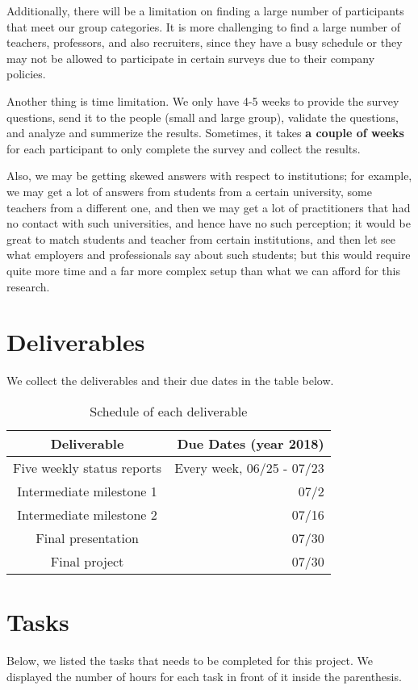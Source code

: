 \documentclass{sigchi}
\begin{document}
Additionally, there will be a limitation on finding a large number of participants that meet our group categories. It is more challenging to find a large number of teachers, professors, and also recruiters, since they have a busy schedule or they may not be allowed to participate in certain surveys due to their company policies. 
  
 Another thing is time limitation. We only have 4-5 weeks to provide the survey questions, send it to the people (small and large group), validate the questions, and analyze and summerize the results. Sometimes, it takes \textbf{a couple of weeks} for each participant to only complete the survey and collect the results.
 
 Also, we may be getting skewed answers with respect to institutions; for example, we may get a lot of answers from students from a certain university, some teachers from a different one, and then we may get a lot of practitioners that had no contact with such universities, and hence have no such perception; it would be great to match students and teacher from certain institutions, and then let see what employers and professionals say about such students; but this would require quite more time and a far more complex setup than what we can afford for this research.
 
  
 \section{Deliverables}
 We collect the deliverables and their due dates in the table below.
 
 \begin{table}[H]
 \centering
 \begin{tabular}{c r} 					%
 \hline\hline						%
 Deliverable & Due Dates (year 2018)\\
 \hline
 Five weekly status reports & Every week, 06/25 - 07/23\\
 Intermediate milestone 1 & 07/2\\
 Intermediate milestone 2 & 07/16\\
 Final presentation & 07/30\\
 Final project & 07/30\\
 \hline
 \end{tabular}
 \caption{Schedule of each deliverable} 	%
 \end{table}
	  
   
  \section{Tasks}
  Below, we listed the tasks that needs to be completed for this project. We displayed the number of hours for each task in front of it inside the parenthesis.\newline
\end{document}
